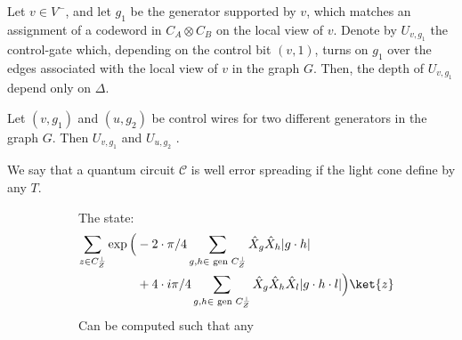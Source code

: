 \begin{claim}
  Let $v \in V^{-}$, and let $g_{1}$ be the generator supported by $v$, which
  matches an assignment of a codeword in $C_{A}\otimes C_{B}$ on the local view
  of $v$. Denote by $U_{v, g_{1}}$ the control-gate which, depending on the
  control bit $(v,1)$, turns on $g_{1}$ over the edges associated with the local
  view of $v$ in the graph $G$. Then, the depth of $U_{v,g_{1}}$ depend only on
  $\Delta$.
\end{claim}

\begin{claim}
  Let $(v,g_{1})$ and $(u,g_{2})$ be control wires for two different generators
  in the graph $G$. Then $U_{v,g_{1}}$ and $U_{u,g_{2}}$ .
\end{claim}

\begin{definition}
  We say that a quantum circuit $\mathcal{C}$ is well error spreading if the
  light cone define by any $T$.
\end{definition}

%
\begin{figure}[h]
  \begin{subfigure}[b]{0.45\textwidth}
    \begin{claim}
      The state:
      \begin{equation*}
        \begin{split}
          \sum_{z \in C_{Z}^{\perp}}  \exp \Big(  & -  2 \cdot \pi/4 \sum_{g ,h
            \in \text{ gen } C_{Z}^{\perp}} \hat{X}_{g}\hat{X}_{h}|g\cdot h| \\
            & +  4 \cdot i\pi/4 \sum_{g,h \in \text{ gen } C_{Z}^{\perp}}
          \hat{X}_{g}\hat{X}_{h}\hat{X}_{l}|g\cdot h \cdot l|  \Big) \ket{z}
        \end{split}
      \end{equation*}
      Can be computed such that any
    \end{claim}
  \end{subfigure}
  \begin{subfigure}[b]{0.05\textwidth}
    \
  \end{subfigure}
  \begin{subfigure}[b]{0.45\textwidth}
  \end{subfigure}
\end{figure}

